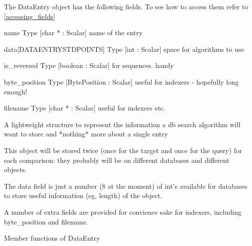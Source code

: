 \label{object_DataEntry}

The DataEntry object has the following fields. To see how to access them refer to \ref{accessing_fields}
\begin{description}
\item{name} Type [char * : Scalar]  name of the entry

\item{data[DATAENTRYSTDPOINTS]} Type [int : Scalar]  space for algorithms to use 

\item{is_reversed} Type [boolean : Scalar]  for sequences. handy

\item{byte_position} Type [BytePosition : Scalar]  useful for indexers - hopefully long enough!

\item{filename} Type [char * : Scalar]  useful for indexers etc.

\end{description}
A lightweight structure to represent the information
a db search algorithm will want to store and *nothing*
more about a single entry


This object will be stored twice (once for the target
and once for the query) for each comparison: they probably
will be on different databases and different objects. 


The data field is just a number (8 at the moment) of int's available
for databases to store useful information (eg, length) of the 
object.


A number of extra fields are provided for convience sake for indexers, 
including byte_position and filename.




Member functions of DataEntry

